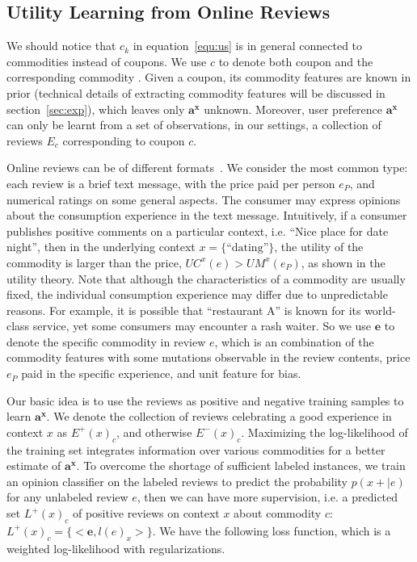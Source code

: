\documentclass[preprint,12pt]{elsarticle}
\begin{document}
\subsection{Utility Learning from Online Reviews}

We should notice that $c_k$ in equation~\ref{equ:us} is in general connected to commodities instead of coupons. We use $c$ to denote both coupon and the corresponding commodity . Given a coupon, its commodity features are known in prior (technical details of extracting commodity features will be discussed in section~\ref{sec:exp}), which leaves only $\mathbf{a^x}$ unknown.  Moreover, user preference $\mathbf{a^x}$ can only be learnt from a set of observations, in our settings, a collection of reviews $E_c$ corresponding to coupon $c$.

Online reviews can be of different formats~\cite{Liu2005Opinion}. We consider the most common type: each review is a brief text message, with the price paid per person $e_P$, and numerical ratings on some general aspects. The consumer may express opinions about the consumption experience in the text message. Intuitively, if a consumer publishes positive comments on a particular context, i.e. ``Nice place for date night'', then in the underlying context $x=\{\textrm{``dating''}\}$, the utility of the commodity is larger than the price, $UC^x(e)>UM^x(e_P)$, as shown in the utility theory. Note that although the characteristics of a commodity are usually fixed, the individual consumption experience may differ due to unpredictable reasons. For example, it is possible that ``restaurant A'' is known for its world-class service, yet some consumers may encounter a rash waiter. So we use $\mathbf{e}$ to denote the specific commodity in review $e$, which is an combination of the commodity features with some mutations observable in the review contents, price $e_P$ paid in the specific experience, and unit feature for bias.

Our basic idea is to use the reviews as positive and negative training samples to learn $\mathbf{a^x}$. We denote the collection of reviews celebrating a good experience in context $x$ as $E^+(x)_c$, and otherwise $E^-(x)_c$. Maximizing the log-likelihood of the training set integrates information over various commodities for a better estimate of $\mathbf{a^x}$. To overcome the shortage of sufficient labeled instances, we train an opinion classifier on the labeled reviews to predict the probability $p(x+|e)$ for any unlabeled review $e$, then we can have more supervision, i.e. a predicted set $L^+(x)_c$ of positive reviews on context $x$ about commodity $c$: $L^+(x)_c=\{<\mathbf{e},l(e)_x>\}$. We have the following loss function, which is a weighted log-likelihood with regularizations.
\end{document}

